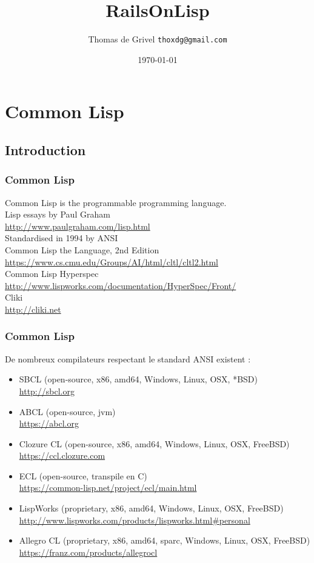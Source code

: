 \documentclass[8pt]{beamer}
\title{RailsOnLisp}
\author{Thomas de Grivel {\tt thoxdg@gmail.com}}
\institute{http://kmx.io}
\date{\today}
\begin{document}
\begin{frame}
\titlepage
\end{frame}

\section{Common Lisp}
\subsection{Introduction}

\begin{frame}
  \frametitle{Common Lisp}
  Common Lisp is the programmable programming language. \\
  \vspace{1em}
  Lisp essays by Paul Graham \\
  \url{http://www.paulgraham.com/lisp.html} \\
  \vspace{1em}
  Standardised in 1994 by ANSI \\
  \vspace{1em}
  Common Lisp the Language, 2nd Edition \\
  \url{https://www.cs.cmu.edu/Groups/AI/html/cltl/cltl2.html} \\
  \vspace{1em}
  Common Lisp Hyperspec \\
  \url{http://www.lispworks.com/documentation/HyperSpec/Front/} \\
  \vspace{1em}
  Cliki \\
  \url{http://cliki.net}
\end{frame}

\begin{frame}
  \frametitle{Common Lisp}
  De nombreux compilateurs respectant le standard ANSI existent :
  \begin{itemize}
  \item SBCL (open-source, x86, amd64, Windows, Linux, OSX, *BSD) \\
    \url{http://sbcl.org}
  \item ABCL (open-source, jvm) \\
    \url{https://abcl.org}
  \item Clozure CL (open-source, x86, amd64, Windows, Linux, OSX, FreeBSD) \\
    \url{https://ccl.clozure.com}
  \item ECL (open-source, transpile en C) \\
    \url{https://common-lisp.net/project/ecl/main.html}
  \item LispWorks (proprietary, x86, amd64, Windows, Linux, OSX, FreeBSD) \\
    \url{http://www.lispworks.com/products/lispworks.html\#personal}
  \item Allegro CL (proprietary, x86, amd64, sparc, Windows, Linux, OSX, FreeBSD) \\
    \url{https://franz.com/products/allegrocl}
  \end{itemize}
\end{frame}
\end{document}
